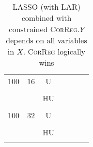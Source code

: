 \documentclass[11pt,a4paper]{article}
\begin{document}
\begin{table}[h!]
\begin{tabular}{|c|c|c|c|c|c|c|}
& & &  \\
\hline %
100 & 16 & U&  \\
& & &  \\
 &  &HU &  \\
& & & \\
\hline %
100 & 32 & U&  \\
& & &  \\
 &  &HU &  \\
& & & \\
\hline
\end{tabular} 
\caption{LASSO (with LAR) combined with constrained \textsc{CorReg}.$Y$  depends on all variables in $X$. \textsc{CorReg} logically wins}\label{YXlinLASSO}
\end{table}
\end{document}
